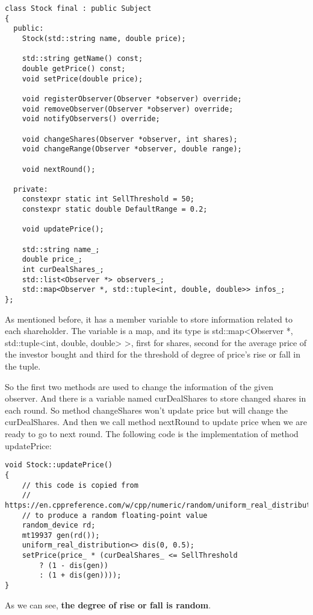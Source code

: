\documentclass{article}
\begin{document}
\begin{lstlisting}
class Stock final : public Subject
{
  public:
    Stock(std::string name, double price);

    std::string getName() const;
    double getPrice() const;
    void setPrice(double price);

    void registerObserver(Observer *observer) override;
    void removeObserver(Observer *observer) override;
    void notifyObservers() override;

    void changeShares(Observer *observer, int shares);
    void changeRange(Observer *observer, double range);

    void nextRound();

  private:
    constexpr static int SellThreshold = 50;
    constexpr static double DefaultRange = 0.2;

    void updatePrice();

    std::string name_;
    double price_;
    int curDealShares_;
    std::list<Observer *> observers_;
    std::map<Observer *, std::tuple<int, double, double>> infos_;
};
\end{lstlisting}

    As mentioned before, it has a member variable to store information related to each shareholder. The variable is a map, and its type is std::map<Observer *, std::tuple<int, double, double> >, first for shares, second for the average price of the investor bought and third for the threshold of degree of price's rise or fall in the tuple.

    So the first two methods are used to change the information of the given observer. And there is a variable named curDealShares to store changed shares in each round. So method changeShares won't update price but will change the curDealShares. And then we call method nextRound to update price when we are ready to go to next round. The following code is the implementation of method updatePrice:

\begin{lstlisting}
void Stock::updatePrice()
{
    // this code is copied from
    // https://en.cppreference.com/w/cpp/numeric/random/uniform_real_distribution
    // to produce a random floating-point value
    random_device rd;
    mt19937 gen(rd());
    uniform_real_distribution<> dis(0, 0.5);
    setPrice(price_ * (curDealShares_ <= SellThreshold
        ? (1 - dis(gen))
        : (1 + dis(gen))));
}
\end{lstlisting}

    As we can see, \textbf{the degree of rise or fall is random}.
\end{document}

